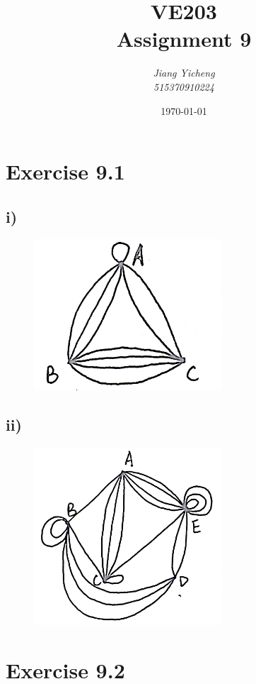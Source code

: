 \documentclass[a4paper,12pt,titlepage]{article}
\author{\textit{Jiang Yicheng}\\\textit{515370910224}}
\title{\textbf{VE203\\
		Assignment 9}}
\date{\today}
\begin{document}
\maketitle

\section*{Exercise 9.1} 
\subsection*{i)}
\begin{figure}[H]
    \centering
    \includegraphics[width=7cm]{1.png}
\end{figure}
\subsection*{ii)}
\begin{figure}[H]
    \centering
    \includegraphics[width=7cm]{2.png}
\end{figure}
\section*{Exercise 9.2}
\end{document}
